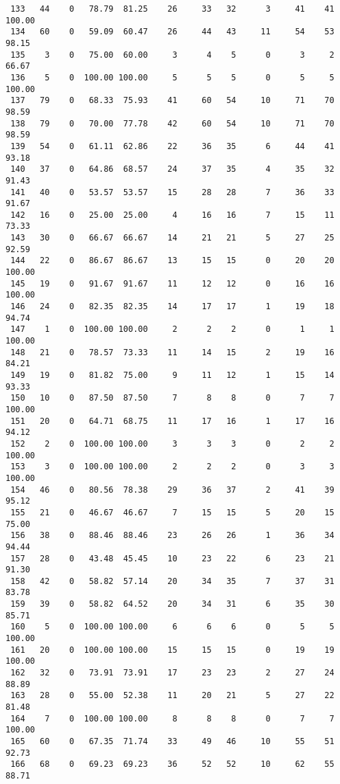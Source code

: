 \begin{verbatim}
 133   44    0   78.79  81.25    26     33   32      3     41    41   100.00
 134   60    0   59.09  60.47    26     44   43     11     54    53    98.15
 135    3    0   75.00  60.00     3      4    5      0      3     2    66.67
 136    5    0  100.00 100.00     5      5    5      0      5     5   100.00
 137   79    0   68.33  75.93    41     60   54     10     71    70    98.59
 138   79    0   70.00  77.78    42     60   54     10     71    70    98.59
 139   54    0   61.11  62.86    22     36   35      6     44    41    93.18
 140   37    0   64.86  68.57    24     37   35      4     35    32    91.43
 141   40    0   53.57  53.57    15     28   28      7     36    33    91.67
 142   16    0   25.00  25.00     4     16   16      7     15    11    73.33
 143   30    0   66.67  66.67    14     21   21      5     27    25    92.59
 144   22    0   86.67  86.67    13     15   15      0     20    20   100.00
 145   19    0   91.67  91.67    11     12   12      0     16    16   100.00
 146   24    0   82.35  82.35    14     17   17      1     19    18    94.74
 147    1    0  100.00 100.00     2      2    2      0      1     1   100.00
 148   21    0   78.57  73.33    11     14   15      2     19    16    84.21
 149   19    0   81.82  75.00     9     11   12      1     15    14    93.33
 150   10    0   87.50  87.50     7      8    8      0      7     7   100.00
 151   20    0   64.71  68.75    11     17   16      1     17    16    94.12
 152    2    0  100.00 100.00     3      3    3      0      2     2   100.00
 153    3    0  100.00 100.00     2      2    2      0      3     3   100.00
 154   46    0   80.56  78.38    29     36   37      2     41    39    95.12
 155   21    0   46.67  46.67     7     15   15      5     20    15    75.00
 156   38    0   88.46  88.46    23     26   26      1     36    34    94.44
 157   28    0   43.48  45.45    10     23   22      6     23    21    91.30
 158   42    0   58.82  57.14    20     34   35      7     37    31    83.78
 159   39    0   58.82  64.52    20     34   31      6     35    30    85.71
 160    5    0  100.00 100.00     6      6    6      0      5     5   100.00
 161   20    0  100.00 100.00    15     15   15      0     19    19   100.00
 162   32    0   73.91  73.91    17     23   23      2     27    24    88.89
 163   28    0   55.00  52.38    11     20   21      5     27    22    81.48
 164    7    0  100.00 100.00     8      8    8      0      7     7   100.00
 165   60    0   67.35  71.74    33     49   46     10     55    51    92.73
 166   68    0   69.23  69.23    36     52   52     10     62    55    88.71

\end{verbatim}
